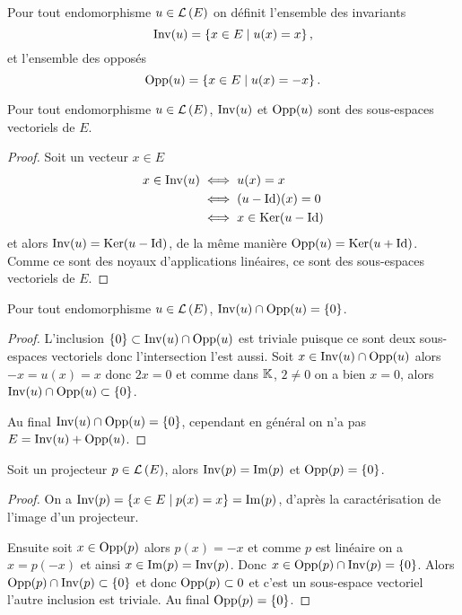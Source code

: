 \begin{defdef}
  Pour tout endomorphisme \(u \in \mathcal{L}\left(E\right)\) on définit l'ensemble des invariants
  \begin{equation}
    \operatorname{Inv}(u)=\left\{x \in E\mathrel{}\middle|\mathrel{}u(x)=x\right\},
  \end{equation}
  et l'ensemble des opposés
  \begin{equation}
    \operatorname{Opp}(u)=\left\{x \in E\mathrel{}\middle|\mathrel{}u(x)=-x\right\}.
  \end{equation}
\end{defdef}

\begin{prop}
  Pour tout endomorphisme \(u \in \mathcal{L}\left(E\right)\), \(\operatorname{Inv}(u)\) et \(\operatorname{Opp}(u)\) sont des sous-espaces vectoriels de \(E\).
\end{prop}
\begin{proof}
  Soit un vecteur \(x \in E\)
  \begin{align}
    x \in \operatorname{Inv}(u) &\iff u(x) = x \\
    &\iff (u-\operatorname{Id})(x)=0 \\
    &\iff x \in \operatorname{Ker}(u-\operatorname{Id})
  \end{align}
  et alors \(\operatorname{Inv}(u) = \operatorname{Ker}(u-\operatorname{Id})\), de la même manière \(\operatorname{Opp}(u) = \operatorname{Ker}(u+\operatorname{Id})\). Comme ce sont des noyaux d'applications linéaires, ce sont des sous-espaces vectoriels de \(E\).
\end{proof}

\begin{prop}
  Pour tout endomorphisme \(u \in \mathcal{L}\left(E\right)\), \(\operatorname{Inv}(u) \cap \operatorname{Opp}(u) = \{0\}\).
\end{prop}
\begin{proof}
  L'inclusion \(\{0\} \subset \operatorname{Inv}(u) \cap \operatorname{Opp}(u)\) est triviale puisque ce sont deux sous-espaces vectoriels donc l'intersection l'est aussi. Soit \(x \in \operatorname{Inv}(u) \cap \operatorname{Opp}(u)\) alors \(-x=u(x)=x\) donc \(2x=0\) et comme dans \(\mathbb{K}\), \(2\neq 0\) on a bien \(x=0\), alors \(\operatorname{Inv}(u) \cap \operatorname{Opp}(u) \subset \{0\}\).

  Au final \(\operatorname{Inv}(u) \cap \operatorname{Opp}(u) = \{0\}\), cependant en général on n'a pas \(E = \operatorname{Inv}(u)+\operatorname{Opp}(u)\).
\end{proof}

\begin{prop}
  Soit un projecteur \(p \in \mathcal{L}\left(E\right)\), alors \(\operatorname{Inv}(p)=\operatorname{Im}(p)\) et \(\operatorname{Opp}(p)=\{0\}\).
\end{prop}
\begin{proof}
  On a \(\operatorname{Inv}(p)=\left\{x \in E\mathrel{}\middle|\mathrel{}p(x)=x\right\}=\operatorname{Im}(p)\), d'après la caractérisation de l'image d'un projecteur.

  Ensuite soit \(x \in \operatorname{Opp}(p)\) alors \(p(x)=-x\) et comme \(p\) est linéaire on a \(x=p(-x)\) et ainsi \(x \in \operatorname{Im}(p)=\operatorname{Inv}(p)\). Donc \(x \in \operatorname{Opp}(p) \cap \operatorname{Inv}(p)= \{0\}\).
  Alors \(\operatorname{Opp}(p) \cap \operatorname{Inv}(p) \subset \{0\}\) et donc \(\operatorname{Opp}(p) \subset {0}\) et c'est un sous-espace vectoriel l'autre inclusion est triviale. Au final  \(\operatorname{Opp}(p)=\{0\}\).
\end{proof}

